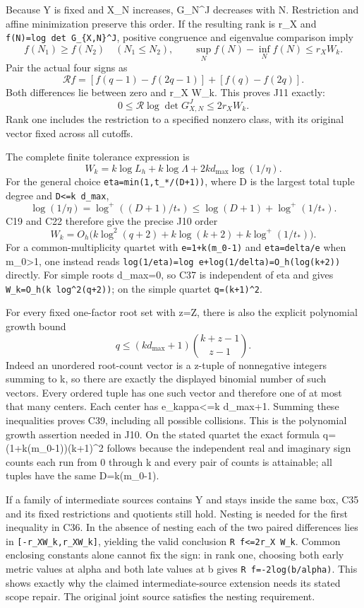 Because Y is fixed and X\_N increases, G\_N\^{}J decreases with N. Restriction and affine minimization preserve this order. If the resulting rank is r\_X and \texttt{f(N)=log\ det\ G\_\{X,N\}\^{}J}, positive congruence and eigenvalue comparison imply \[
f(N_1)\ge f(N_2)\quad(N_1\le N_2),\qquad
\sup_Nf(N)-\inf_Nf(N)\le r_XW_k.
\] Pair the actual four signs as \[
\mathcal Rf=[f(q-1)-f(2q-1)]+[f(q)-f(2q)].
\] Both differences lie between zero and r\_X W\_k. This proves J11 exactly: \[
0\le\mathcal R\log\det G_{X,N}^J\le2r_XW_k.
\tag{C36}
\] Rank one includes the restriction to a specified nonzero class, with its original vector fixed across all cutoffs.

The complete finite tolerance expression is \[
W_k=k\log L_h+k\log\Lambda+2kd_{\max}\log(1/\eta).
\tag{C37}
\] For the general choice \texttt{eta=min(1,t\_*/(D+1))}, where D is the largest total tuple degree and \texttt{D\textless{}=k\ d\_max}, \[
\log(1/\eta)=\log^+((D+1)/t_*)
 \le\log(D+1)+\log^+(1/t_*).
\] C19 and C22 therefore give the precise J10 order \[
W_k=O_h\bigl(k\log^2(q+2)+k\log(k+2)
 +k\log^+(1/t_*)\bigr).
\tag{C38}
\] For a common-multiplicity quartet with \texttt{e=1+k(m\_0-1)} and \texttt{eta=delta/e} when m\_0\textgreater1, one instead reads \texttt{log(1/eta)=log\ e+log(1/delta)=O\_h(log(k+2))} directly. For simple roots d\_max=0, so C37 is independent of eta and gives \texttt{W\_k=O\_h(k\ log\^{}2(q+2))}; on the simple quartet \texttt{q=(k+1)\^{}2}.

For every fixed one-factor root set with z=\textbar Z\textbar, there is also the explicit polynomial growth bound \[
q\le(kd_{\max}+1)\binom{k+z-1}{z-1}.
\tag{C39}
\] Indeed an unordered root-count vector is a z-tuple of nonnegative integers summing to k, so there are exactly the displayed binomial number of such vectors. Every ordered tuple has one such vector and therefore one of at most that many centers. Each center has e\_kappa\textless=k d\_max+1. Summing these inequalities proves C39, including all possible collisions. This is the polynomial growth assertion needed in J10. On the stated quartet the exact formula q=(1+k(m\_0-1))(k+1)\^{}2 follows because the independent real and imaginary sign counts each run from 0 through k and every pair of counts is attainable; all tuples have the same D=k(m\_0-1).

If a family of intermediate sources contains Y and stays inside the same box, C35 and its fixed restrictions and quotients still hold. Nesting is needed for the first inequality in C36. In the absence of nesting each of the two paired differences lies in \texttt{{[}-r\_XW\_k,r\_XW\_k{]}}, yielding the valid conclusion \texttt{\textbar{}R\ f\textbar{}\textless{}=2r\_X\ W\_k}. Common enclosing constants alone cannot fix the sign: in rank one, choosing both early metric values at alpha and both late values at b gives \texttt{R\ f=-2log(b/alpha)}. This shows exactly why the claimed intermediate-source extension needs its stated scope repair. The original joint source satisfies the nesting requirement.

